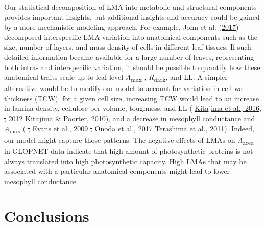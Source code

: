 \documentclass[
  12pt,
  a4paper,
,tablecaptionabove
]{scrartcl}
\providecommand{\DIFaddtex}[1]{{\protect\color{blue}\uwave{#1}}} %
\providecommand{\DIFdeltex}[1]{{\protect\color{red}\sout{#1}}}                      %
\providecommand{\DIFaddbegin}{} %
\providecommand{\DIFaddend}{} %
\providecommand{\DIFdelbegin}{} %
\providecommand{\DIFdelend}{} %
\providecommand{\DIFadd}[1]{\texorpdfstring{\DIFaddtex{#1}}{#1}} %
\providecommand{\DIFdel}[1]{\texorpdfstring{\DIFdeltex{#1}}{}} %
\newcommand{\DIFscaledelfig}{0.5}
\newlength{\DIFdelgraphicswidth} %
\newlength{\DIFdelgraphicsheight} %
\newcommand{\DIFaddincludegraphics}[2][]{{\color{blue}\fbox{\DIFOincludegraphics[#1]{#2}}}} %
\newcommand{\DIFdelincludegraphics}[2][]{%
\sbox{\DIFdelgraphicsbox}{\DIFOincludegraphics[#1]{#2}}%
\settoboxwidth{\DIFdelgraphicswidth}{\DIFdelgraphicsbox} %
\settoboxtotalheight{\DIFdelgraphicsheight}{\DIFdelgraphicsbox} %
\scalebox{\DIFscaledelfig}{%
\parbox[b]{\DIFdelgraphicswidth}{\usebox{\DIFdelgraphicsbox}\\[-\baselineskip] \rule{\DIFdelgraphicswidth}{0em}}\llap{\resizebox{\DIFdelgraphicswidth}{\DIFdelgraphicsheight}{%
\setlength{\unitlength}{\DIFdelgraphicswidth}%
\begin{picture}(1,1)%
\thicklines\linethickness{2pt} %
{\color[rgb]{1,0,0}\put(0,0){\framebox(1,1){}}}%
{\color[rgb]{1,0,0}\put(0,0){\line( 1,1){1}}}%
{\color[rgb]{1,0,0}\put(0,1){\line(1,-1){1}}}%
\end{picture}%
}\hspace*{3pt}}} %
} %
\DeclareRobustCommand{\DIFaddbegin}{\DIFOaddbegin \let\includegraphics\DIFaddincludegraphics} %
\DeclareRobustCommand{\DIFaddend}{\DIFOaddend \let\includegraphics\DIFOincludegraphics} %
\DeclareRobustCommand{\DIFdelbegin}{\DIFOdelbegin \let\includegraphics\DIFdelincludegraphics} %
\DeclareRobustCommand{\DIFdelend}{\DIFOaddend \let\includegraphics\DIFOincludegraphics} %
\begin{document}
Our statistical decomposition of LMA into metabolic and structural
components provides important insights, but additional insights and
accuracy could be gained by a more mechanistic modeling approach. For
example, John et al. (\protect\hyperlink{ref-John2017}{2017}) decomposed
interspecific LMA variation into anatomical components such as the size,
number of layers, and mass density of cells in different leaf tissues.
If such detailed information became available for a large number of
leaves, representing both intra- and interspecific variation, it should
be possible to quantify how these anatomical traits scale up to
leaf-level \emph{A}\textsubscript{max} , \emph{R}\textsubscript{dark},
and LL. A simpler alternative would be to modify our model to account
for variation in cell wall thickness (TCW): for a given cell size,
increasing TCW would lead to an increase in lamina density, cellulose
per volume, toughness, and LL
(\protect\DIFdelbegin %
\DIFdelend \DIFaddbegin \hyperlink{ref-Kitajima2016}{Kitajima et al., 2016}\DIFaddend ,
\protect\DIFdelbegin %
\DIFdel{,
}\DIFdelend \DIFaddbegin \hyperlink{ref-Kitajima2012}{2012}\DIFadd{;
}\DIFaddend \protect\DIFdelbegin %
\DIFdelend \DIFaddbegin \hyperlink{ref-Kitajima2010}{Kitajima \& Poorter, 2010}\DIFaddend ), and a
decrease in mesophyll conductance and \emph{A}\textsubscript{max}
(\protect\DIFdelbegin %
\DIFdel{,
}\DIFdelend \DIFaddbegin \hyperlink{ref-Evans2009}{Evans et al., 2009}\DIFadd{;
}\DIFaddend \protect\DIFdelbegin %
\DIFdel{,
}\DIFdelend \DIFaddbegin \hyperlink{ref-Onoda2017}{Onoda et al., 2017}\DIFadd{;
}\DIFaddend \protect\DIFdelbegin %
\DIFdelend \DIFaddbegin \hyperlink{ref-Terashima2011}{Terashima et al., 2011}\DIFaddend ). Indeed,
our model might capture those patterns. The negative effects of LMAs on
\emph{A}\textsubscript{area} in GLOPNET data indicate that high amount
of photosynthetic proteins is not always translated into high
photosynthetic capacity. High LMAs that may be associated with a
particular anatomical components might lead to lower mesophyll
conductance.

\hypertarget{conclusions}{%
\section{Conclusions}\label{conclusions}}
\end{document}
